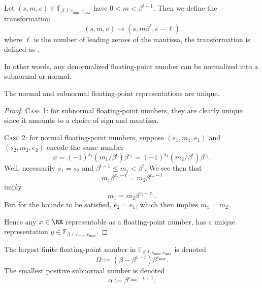 \begin{defn}
Let $(s,m,e)\in\mathbb{F}_{\beta,t,e_{\text{min}},e_{\text{max}}}$
have $0<m<\beta^{t-1}$. Then we define the transformation
\begin{equation}
  (s,m,e)\to(s,m\beta^{\ell},e-\ell)
\end{equation}
where $\ell$ is the number of leading zeroes of the mantissa, the
transformation is defined as .
\end{defn}

\begin{rmk}
In other words, any denormalized floating-point number can be normalized
into a subnormal or normal.
\end{rmk}


\begin{thm}
The normal and subnormal floating-point representations are unique.
\end{thm}
\begin{proof}
\textsc{Case 1:} for subnormal floating-point numbers, they are clearly
unique since it amounts to a choice of sign and mantissa.

\textsc{Case 2:} for normal floating-point numbers, suppose
$(s_{1},m_{1},e_{1})$ and $(s_{2},m_{2},e_{2})$ encode the same number
\begin{equation}
  x = (-1)^{s_{1}}(m_{1}/\beta^{t})\beta^{e_{1}} = (-1)^{s_{2}}(m_{2}/\beta^{t})\beta^{e_{2}}.
\end{equation}
Well, necessarily $s_{1}=s_{2}$ and $\beta^{t-1}\leq m_{j} < \beta^{t}$.
We see then that
\begin{equation}
  m_{1}\beta^{e_{1}-t} = m_{2}\beta^{e_{2}-t}
\end{equation}
imply
\begin{equation}
  m_{1} = m_{2}\beta^{e_{2}-e_{1}}.
\end{equation}
But for the bounds to be satisfied, $e_{2}=e_{1}$, which then implies
$m_{1}=m_{2}$.

Hence any $x\in\RR$ representable as a floating-point number, has a unique
representation $y\in\mathbb{F}_{\beta,t,e_{\text{min}},e_{\text{max}}}$.
\end{proof}


\begin{defn}
  The largest finite floating-point number in $\mathbb{F}_{\beta,t,e_{\text{min}},e_{\text{max}}}$
  is denoted
  \begin{equation}
    \Omega := (\beta - \beta^{1-t})\beta^{e_{\text{max}}}.
  \end{equation}
  The smallest positive subnormal number is denoted
  \begin{equation}
    \alpha := \beta^{e_{\text{min}}-t+1}. 
  \end{equation}
\end{defn}

